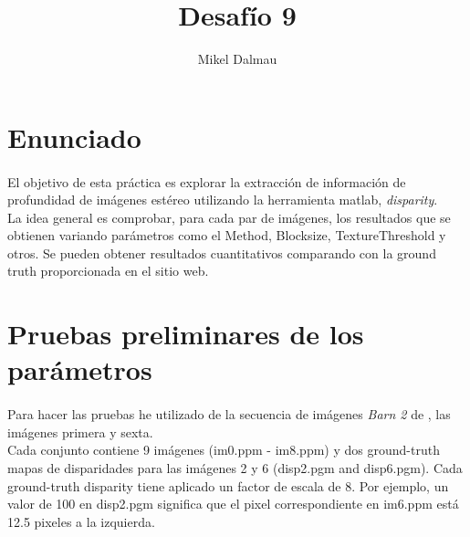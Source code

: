 \documentclass[es,gi]{ifirak}\usepackage[]{graphicx}\usepackage[]{color}
\begin{document}
\title{Desafío 9}
\author{Mikel Dalmau}

\maketitle




\tableofcontents

\section{Enunciado}
\paragraph{}
El objetivo de esta práctica es explorar la extracción de información de profundidad de imágenes estéreo utilizando la herramienta matlab, \textit{disparity}.\\

La idea general es comprobar, para cada par de imágenes, los resultados que se obtienen variando parámetros como el Method, Blocksize, TextureThreshold y  otros. Se pueden obtener resultados cuantitativos comparando con la ground truth proporcionada en el sitio web.

\pagebreak

\section{Pruebas preliminares de los parámetros}
\paragraph{}Para hacer las pruebas he utilizado de la secuencia de imágenes \textit{Barn 2} de \cite{key-2}, las imágenes primera y sexta.\\

Cada conjunto contiene 9 imágenes (im0.ppm - im8.ppm) y dos ground-truth mapas de disparidades para las imágenes 2 y 6 (disp2.pgm and disp6.pgm). Cada ground-truth disparity tiene aplicado un factor de escala de 8. Por ejemplo, un valor de 100 en disp2.pgm significa que el pixel correspondiente en im6.ppm está 12.5 pixeles a la izquierda.\\
\end{document}
